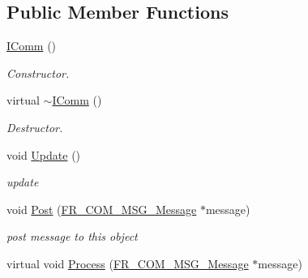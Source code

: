 \subsection*{Public Member Functions}
\begin{DoxyCompactItemize}
\item 
\hypertarget{classFramework_1_1Communication_1_1IComm_ab98e44643ceabe4bec83c75b05cbaea1}{
\hyperlink{classFramework_1_1Communication_1_1IComm_ab98e44643ceabe4bec83c75b05cbaea1}{IComm} ()}
\label{classFramework_1_1Communication_1_1IComm_ab98e44643ceabe4bec83c75b05cbaea1}

\begin{DoxyCompactList}\small\item\em Constructor. \item\end{DoxyCompactList}\item 
\hypertarget{classFramework_1_1Communication_1_1IComm_a0cc60eca3f1493ca8a4195669b5ab491}{
virtual \hyperlink{classFramework_1_1Communication_1_1IComm_a0cc60eca3f1493ca8a4195669b5ab491}{$\sim$IComm} ()}
\label{classFramework_1_1Communication_1_1IComm_a0cc60eca3f1493ca8a4195669b5ab491}

\begin{DoxyCompactList}\small\item\em Destructor. \item\end{DoxyCompactList}\item 
\hypertarget{classFramework_1_1Communication_1_1IComm_aa3e834d1c61401f2d549a053b6de4f28}{
void \hyperlink{classFramework_1_1Communication_1_1IComm_aa3e834d1c61401f2d549a053b6de4f28}{Update} ()}
\label{classFramework_1_1Communication_1_1IComm_aa3e834d1c61401f2d549a053b6de4f28}

\begin{DoxyCompactList}\small\item\em update \item\end{DoxyCompactList}\item 
\hypertarget{classFramework_1_1Communication_1_1IComm_aa645b9580fb0ad46347fc81ef7c3ce10}{
void \hyperlink{classFramework_1_1Communication_1_1IComm_aa645b9580fb0ad46347fc81ef7c3ce10}{Post} (\hyperlink{structFramework_1_1Communication_1_1Message_1_1Message}{FR\_\-COM\_\-MSG\_\-Message} $\ast$message)}
\label{classFramework_1_1Communication_1_1IComm_aa645b9580fb0ad46347fc81ef7c3ce10}

\begin{DoxyCompactList}\small\item\em post message to this object \item\end{DoxyCompactList}\item 
\hypertarget{classFramework_1_1Communication_1_1IComm_a89cc2cf59cd93cb9025425d83e547ed1}{
virtual void \hyperlink{classFramework_1_1Communication_1_1IComm_a89cc2cf59cd93cb9025425d83e547ed1}{Process} (\hyperlink{structFramework_1_1Communication_1_1Message_1_1Message}{FR\_\-COM\_\-MSG\_\-Message} $\ast$message)}
\label{classFramework_1_1Communication_1_1IComm_a89cc2cf59cd93cb9025425d83e547ed1}


\end{DoxyCompactItemize}
